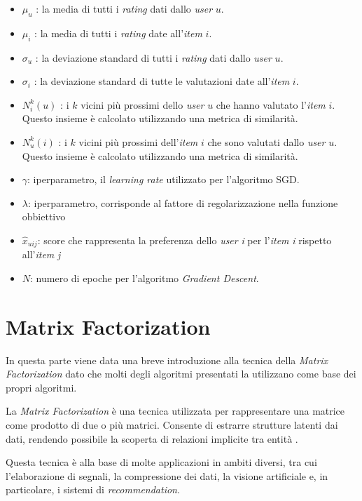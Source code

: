 \begin{itemize}
    \item $\mu_u$ : la media di tutti i \textit{rating} dati dallo \textit{user} $u$.
    \item $\mu_i$ : la media di tutti i \textit{rating} date all'\textit{item} $i$.
    \item $\sigma_u$ : la deviazione standard di tutti i \textit{rating} dati dallo \textit{user} $u$.
    \item $\sigma_i$ : la deviazione standard di tutte le valutazioni date all'\textit{item} $i$.
    \item $N_i^k(u)$ : i $k$ vicini più prossimi dello \textit{user} $u$ che hanno valutato l'\textit{item} $i$. Questo insieme è calcolato utilizzando una metrica di similarità.
    \item $N_u^k(i)$ : i $k$ vicini più prossimi dell'\textit{item} $i$ che sono valutati dallo \textit{user} $u$. Questo insieme è calcolato utilizzando una metrica di similarità.
    \item $\gamma$: iperparametro, il \textit{learning rate} utilizzato per l'algoritmo SGD.
    \item $\lambda$: iperparametro, corrisponde al fattore di regolarizzazione nella funzione obbiettivo
    \item $\hat{x}_{uij}$: score che rappresenta la preferenza dello \textit{user} \textit{i} per l'\textit{item} \textit{i} rispetto all'\textit{item} \textit{j}
    \item $N$: numero di epoche per l'algoritmo \textit{Gradient Descent}.
\end{itemize}

\section{Matrix Factorization}

In questa parte viene data una breve introduzione alla tecnica della \textit{Matrix Factorization} dato che molti degli algoritmi presentati la utilizzano come base dei propri algoritmi.

La \textit{Matrix Factorization} è una tecnica utilizzata per rappresentare una matrice come prodotto di due o più matrici. Consente di estrarre strutture latenti dai dati, rendendo possibile la scoperta di relazioni implicite tra entità \cite{MC}.

Questa tecnica è alla base di molte applicazioni in ambiti diversi, tra cui l'elaborazione di segnali, la compressione dei dati, la visione artificiale e, in particolare, i sistemi di \textit{recommendation}.

